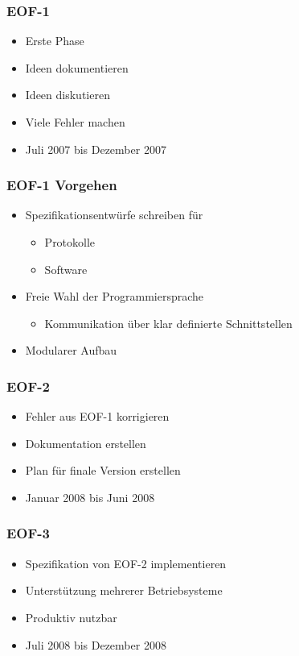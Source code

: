 \documentclass{beamer}
\begin{document}
\frame
{
  \frametitle{EOF-1}

  \begin{itemize}
  \item Erste Phase
  \pause
  \item Ideen dokumentieren
  \pause
  \item Ideen diskutieren
  \pause
  \item Viele Fehler machen
  \pause
  \item Juli 2007 bis Dezember 2007
  \end{itemize}
}

\frame
{
  \frametitle{EOF-1 Vorgehen}

  \begin{itemize}
  \item Spezifikationsentw\"urfe schreiben f\"ur
  \pause
  \begin{itemize}
  \item Protokolle
  \pause
  \item Software
  \pause
  \end{itemize}
  \item Freie Wahl der Programmiersprache
  \pause
  \begin{itemize}
  \item Kommunikation \"uber klar definierte Schnittstellen
  \end{itemize}
  \pause
  \item Modularer Aufbau
  \end{itemize}
}

\frame
{
  \frametitle{EOF-2}

  \begin{itemize}
  \item Fehler aus EOF-1 korrigieren
  \pause
  \item Dokumentation erstellen
  \pause
  \item Plan f\"ur finale Version erstellen
  \pause
  \item Januar 2008 bis Juni 2008
  \end{itemize}
}

\frame
{
  \frametitle{EOF-3}

  \begin{itemize}
  \item Spezifikation von EOF-2 implementieren
  \pause
  \item Unterst\"utzung mehrerer Betriebsysteme
  \pause
  \item Produktiv nutzbar
  \pause
  \item Juli 2008 bis Dezember 2008
  \end{itemize}
}
\end{document}
